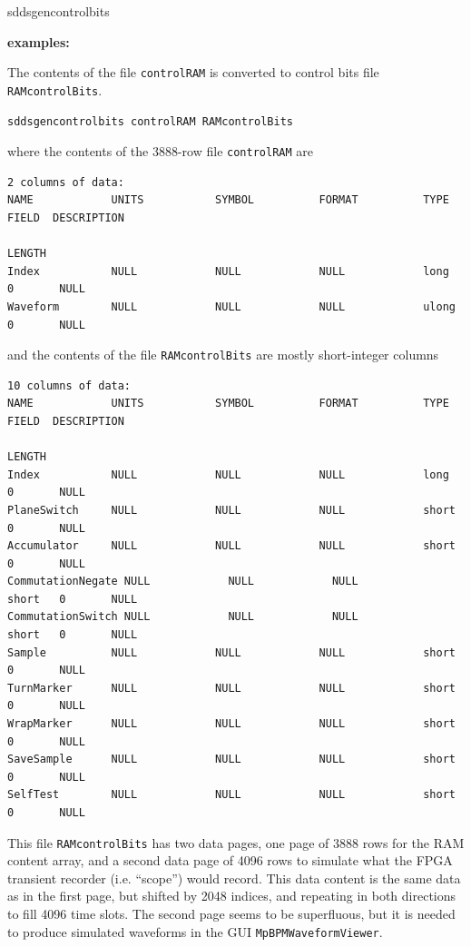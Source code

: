 \begin{sddsprog}{sddsgencontrolbits}
\item \textbf{examples:}

The contents of the file {\tt controlRAM} is converted to control bits
file {\tt RAMcontrolBits}.
\begin{verbatim}
sddsgencontrolbits controlRAM RAMcontrolBits
\end{verbatim}
where the contents of the 3888-row file {\tt controlRAM} are
\begin{verbatim}
2 columns of data:
NAME            UNITS           SYMBOL          FORMAT          TYPE    FIELD  DESCRIPTION
                                                                        LENGTH
Index           NULL            NULL            NULL            long    0       NULL
Waveform        NULL            NULL            NULL            ulong   0       NULL
\end{verbatim}
and the contents of the file {\tt RAMcontrolBits} are mostly short-integer columns
\begin{verbatim}
10 columns of data:
NAME            UNITS           SYMBOL          FORMAT          TYPE    FIELD  DESCRIPTION
                                                                        LENGTH
Index           NULL            NULL            NULL            long    0       NULL
PlaneSwitch     NULL            NULL            NULL            short   0       NULL
Accumulator     NULL            NULL            NULL            short   0       NULL
CommutationNegate NULL            NULL            NULL            short   0       NULL
CommutationSwitch NULL            NULL            NULL            short   0       NULL
Sample          NULL            NULL            NULL            short   0       NULL
TurnMarker      NULL            NULL            NULL            short   0       NULL
WrapMarker      NULL            NULL            NULL            short   0       NULL
SaveSample      NULL            NULL            NULL            short   0       NULL
SelfTest        NULL            NULL            NULL            short   0       NULL
\end{verbatim}
This file {\tt RAMcontrolBits} has two data pages, one page of 3888
rows for the RAM content array, and a second data page of 4096 rows to
simulate what the FPGA transient recorder (i.e. ``scope'') would
record. This data content is the same data as in the first page, but
shifted by 2048 indices, and repeating in both directions to fill 4096
time slots. The second page seems to be superfluous, but it is needed
to produce simulated waveforms in the GUI {\tt MpBPMWaveformViewer}.


\end{sddsprog}
